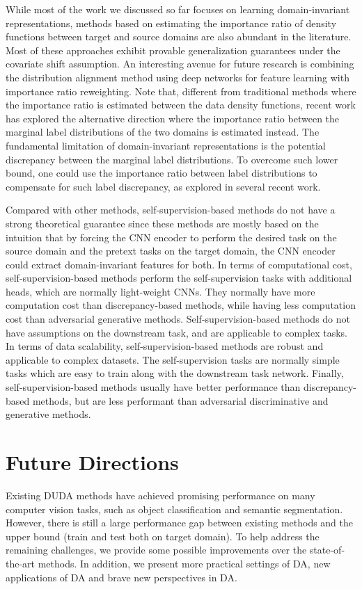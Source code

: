 \documentclass[conference]{IEEEtran}
\begin{document}
While most of the work we discussed so far focuses on learning domain-invariant 
representations, methods based on estimating the importance ratio of density functions
between target and source domains are also abundant in the literature.
Most of these approaches exhibit provable generalization guarantees under the covariate shift 
assumption.
An interesting avenue for future research is combining the distribution alignment method 
using deep networks for feature learning with importance ratio reweighting.
Note that, different from traditional methods where the importance ratio is estimated between 
the data density functions, recent work has explored the alternative direction where 
the importance ratio between the marginal label distributions of the two domains is 
estimated instead.
The fundamental limitation of domain-invariant representations is the potential discrepancy 
between the marginal label distributions. 
To overcome such lower bound, one could use the importance ratio between label distributions
to compensate for such label discrepancy, as explored in several recent work.

Compared with other methods, self-supervision-based methods do not have a strong
theoretical guarantee since these methods are mostly based on the intuition that by forcing
the CNN encoder to perform the desired task on the source domain and the pretext tasks on the target domain,
the CNN encoder could extract domain-invariant features for both.
In terms of computational cost, self-supervision-based methods perform the self-supervision
tasks with additional heads, which are normally light-weight CNNs. 
They normally have more computation cost than discrepancy-based methods, while having 
less computation cost than adversarial generative methods.
Self-supervision-based methods do not have assumptions on the downstream task, 
and are applicable to complex tasks.
In terms of data scalability, self-supervision-based methods are robust 
and applicable to complex datasets.
The self-supervision tasks are normally simple tasks which are easy to train along
with the downstream task network. 
Finally, self-supervision-based methods usually have better performance than
discrepancy-based methods, but are less performant than adversarial discriminative and 
generative methods. 

\section{Future Directions}
Existing DUDA methods have achieved promising performance on many computer vision
tasks, such as object classification and semantic segmentation.
However, there is still a large performance gap between existing methods and 
the upper bound (train and test both on target domain). 
To help address the remaining challenges, we provide some possible improvements
over the state-of-the-art methods. In addition, we present more practical settings of 
DA, new applications of DA and brave new perspectives in DA.
\end{document}
